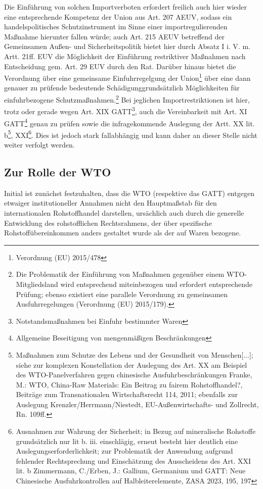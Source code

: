 \documentclass[12pt,a4paper,oneside]{book} %
\begin{document}
Die Einführung von solchen Importverboten erfordert freilich auch hier wieder eine entsprechende Kompetenz der Union aus Art. 207 AEUV, sodass ein handelspolitisches Schutzinstrument im Sinne einer importregulierenden Maßnahme hierunter fallen würde; auch Art. 215 AEUV betreffend der Gemeinsamen Außen- und Sicherheitspolitik bietet hier durch Absatz I i. V. m. Artt. 21ff. EUV die Möglichkeit der Einführung restriktiver Maßnahmen nach Entscheidung gem. Art. 29 EUV durch den Rat. Darüber hinaus bietet die Verordnung über eine gemeinsame Einfuhrregelgung der Union\footnote{Verordnung (EU) 2015/478} über eine dann genauer zu prüfende \glqq bedeutende Schädigung\grqq grundsätzlich Möglichkeiten für einfuhrbezogene Schutzmaßnahmen.\footnote{Die Problematik der Einführung von Maßnahmen gegenüber einem WTO-Mitgliedsland wird entsprechend miteinbezogen und erfordert entsprechende Prüfung; ebenso existiert eine parallele Verordnung zu gemeinsamen Ausfuhrregelungen (Verordnung (EU) 2015/179).} Bei jeglichen Importrestriktionen ist hier, trotz oder gerade wegen Art. XIX GATT\footnote{Notstandsmaßnahmen bei Einfuhr bestimmter Waren}, auch die Vereinbarkeit mit Art. XI GATT\footnote{Allgemeine Beseitigung von mengenmäßigen Beschränkungen} genau zu prüfen sowie die infragekommende Auslegung der Artt. XX lit. b\footnote{Maßnahmen zum Schutze des Lebens und der Gesundheit von Menschen[...]; siehe zur komplexen Konstellation der Auslegung des Art. XX am Beispiel des WTO-Panelverfahren gegen chinesische Ausfuhrbeschränkungen Franke, M.: WTO, China-Raw Materials: Ein Beitrag zu fairem Rohstoffhandel?, Beiträge zum Transnationalen Wirtschaftsrecht 114, 2011; ebenfalls zur Auslegung Krenzler/Herrmann/Niestedt, EU-Außenwirtschafts- und Zollrecht, Rn. 109ff.}, XXI\footnote{Ausnahmen zur Wahrung der Sicherheit; in Bezug auf mineralische Rohstoffe grundsätzlich nur lit b. iii. einschlägig, erneut besteht hier deutlich eine Auslegungserforderlichkeit; zur Problematik der Anwendung aufgrund fehlender Rechtsprechung und Einschätzung des Ausscheidens des Art. XXI lit. b Zimmermann, C./Erben, J.: Gallium, Germanium und GATT: Neue Chinesische Ausfuhrkontrollen auf Halbleiterelemente, ZASA 2023, 195, 197}. Dies ist jedoch stark fallabhängig und kann daher an dieser Stelle nicht weiter verfolgt werden.

\subsection{Zur Rolle der WTO}
Initial ist zunächst festzuhalten, dass die WTO (respektive das GATT) entgegen etwaiger institutioneller Annahmen nicht den Hauptmaßstab für den internationalen Rohstoffhandel darstellen, ursächlich auch durch die generelle Entwicklung des rohstofflichen Rechtsrahmens, der über spezifische Rohstoffübereinkommen anders gestaltet wurde als der auf Waren bezogene.\autocite{Schorkopf, Rohstoffverwaltung, Rn. 42}
\end{document}
